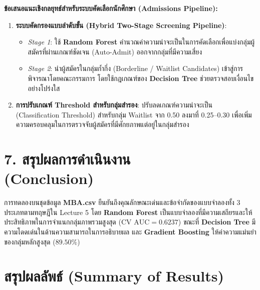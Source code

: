 \documentclass[12pt,a4paper]{article}
\newcommand{\codevar}[1]{\textcolor{codeaccent}{\textbf{#1}}}
\begin{document}
\begin{ansbox}
\textbf{ข้อเสนอแนะเชิงกลยุทธ์สำหรับระบบคัดเลือกนักศึกษา (Admissions Pipeline):}
\begin{enumerate}[leftmargin=16pt, itemsep=2pt]
    \item \textbf{ระบบคัดกรองแบบลำดับขั้น (Hybrid Two-Stage Screening Pipeline)}:
    \begin{itemize}
        \item \textit{Stage 1}: ใช้ \textbf{Random Forest} คำนวณค่าความน่าจะเป็นในการคัดเลือกเพื่อแบ่งกลุ่มผู้สมัครที่ผ่านเกณฑ์ชัดเจน (Auto-Admit) ออกจากกลุ่มที่มีความเสี่ยง
        \item \textit{Stage 2}: นำผู้สมัครในกลุ่มก้ำกึ่ง (Borderline / Waitlist Candidates) เข้าสู่การพิจารณาโดยคณะกรรมการ โดยใช้กฎเกณฑ์ของ \textbf{Decision Tree} ช่วยตรวจสอบเงื่อนไขอย่างโปร่งใส
    \end{itemize}
    \item \textbf{การปรับเกณฑ์ Threshold สำหรับกลุ่มสำรอง}: ปรับลดเกณฑ์ความน่าจะเป็น (Classification Threshold) สำหรับกลุ่ม Waitlist จาก 0.50 ลงมาที่ 0.25--0.30 เพื่อเพิ่มความครอบคลุมในการตรวจจับผู้สมัครที่มีศักยภาพแต่อยู่ในกลุ่มสำรอง
\end{enumerate}
\end{ansbox}

\section*{7. สรุปผลการดำเนินงาน\\ \large(Conclusion)}

การทดลองบนชุดข้อมูล \codevar{MBA.csv} ยืนยันถึงคุณลักษณะเด่นและข้อจำกัดของแบบจำลองทั้ง 3 ประเภทตามทฤษฎีใน Lecture 5 โดย \textbf{Random Forest} เป็นแบบจำลองที่มีความเสถียรและให้ประสิทธิภาพในการจำแนกกลุ่มภาพรวมสูงสุด ($\text{CV AUC} = 0.6237$) ขณะที่ \textbf{Decision Tree} มีความโดดเด่นในด้านความสามารถในการอธิบายผล และ \textbf{Gradient Boosting} ให้ค่าความแม่นยำของกลุ่มหลักสูงสุด ($89.50\%$)

\section*{สรุปผลลัพธ์ (Summary of Results)}
\end{document}
